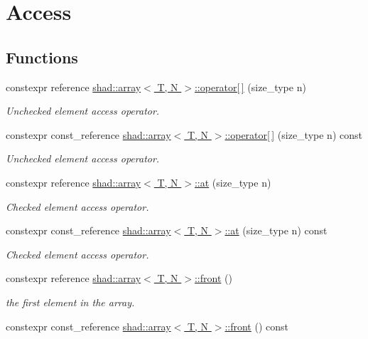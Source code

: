 \hypertarget{group__Element}{\section{Access}
\label{group__Element}
}
\subsection*{Functions}
\begin{DoxyCompactItemize}
\item 
constexpr reference \hyperlink{group__Element_gaedde045849710fdb88ff7aa46f7b83bb}{shad\-::array$<$ T, N $>$\-::operator\mbox{[}$\,$\mbox{]}} (size\-\_\-type n)
\begin{DoxyCompactList}\small\item\em Unchecked element access operator. \end{DoxyCompactList}\item 
constexpr const\-\_\-reference \hyperlink{group__Element_gac3910c3068e053991d5276a49c88450b}{shad\-::array$<$ T, N $>$\-::operator\mbox{[}$\,$\mbox{]}} (size\-\_\-type n) const 
\begin{DoxyCompactList}\small\item\em Unchecked element access operator. \end{DoxyCompactList}\item 
constexpr reference \hyperlink{group__Element_gaf19fa246a5be092c19a70931728f01af}{shad\-::array$<$ T, N $>$\-::at} (size\-\_\-type n)
\begin{DoxyCompactList}\small\item\em Checked element access operator. \end{DoxyCompactList}\item 
constexpr const\-\_\-reference \hyperlink{group__Element_ga688d9b73d4c362ca435c5274745cc5c1}{shad\-::array$<$ T, N $>$\-::at} (size\-\_\-type n) const 
\begin{DoxyCompactList}\small\item\em Checked element access operator. \end{DoxyCompactList}\item 
constexpr reference \hyperlink{group__Element_ga71e271185d26a12b8f520c082dc50f99}{shad\-::array$<$ T, N $>$\-::front} ()
\begin{DoxyCompactList}\small\item\em the first element in the array. \end{DoxyCompactList}\item 
constexpr const\-\_\-reference \hyperlink{group__Element_ga7c6cac24de62810ca02fb7b89ae876cb}{shad\-::array$<$ T, N $>$\-::front} () const 

\end{DoxyCompactItemize}
